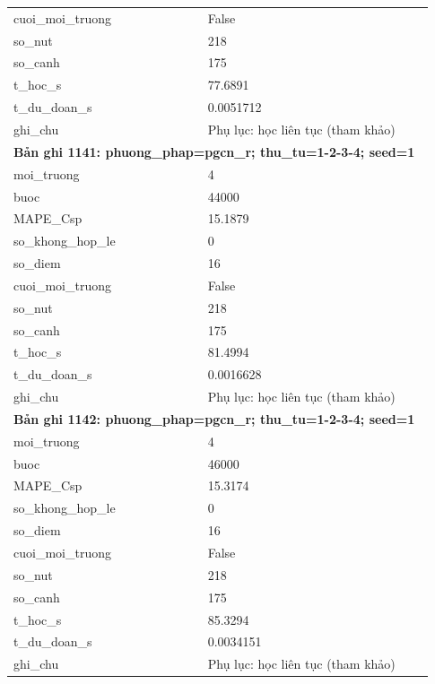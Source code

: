 \begin{longtable}{p{0.43\linewidth}p{0.50\linewidth}}
cuoi\_\allowbreak moi\_\allowbreak truong & False \\
so\_\allowbreak nut & 218 \\
so\_\allowbreak canh & 175 \\
t\_\allowbreak hoc\_\allowbreak s & 77.6891 \\
t\_\allowbreak du\_\allowbreak doan\_\allowbreak s & 0.0051712 \\
ghi\_\allowbreak chu & Phụ lục: học liên tục (tham khảo) \\
\midrule
\multicolumn{2}{p{0.95\linewidth}}{\textbf{Bản ghi 1141: phuong\_phap=pgcn\_r; thu\_tu=1-2-3-4; seed=1}} \\
moi\_\allowbreak truong & 4 \\
buoc & 44000 \\
MAPE\_\allowbreak Csp & 15.1879 \\
so\_\allowbreak khong\_\allowbreak hop\_\allowbreak le & 0 \\
so\_\allowbreak diem & 16 \\
cuoi\_\allowbreak moi\_\allowbreak truong & False \\
so\_\allowbreak nut & 218 \\
so\_\allowbreak canh & 175 \\
t\_\allowbreak hoc\_\allowbreak s & 81.4994 \\
t\_\allowbreak du\_\allowbreak doan\_\allowbreak s & 0.0016628 \\
ghi\_\allowbreak chu & Phụ lục: học liên tục (tham khảo) \\
\midrule
\multicolumn{2}{p{0.95\linewidth}}{\textbf{Bản ghi 1142: phuong\_phap=pgcn\_r; thu\_tu=1-2-3-4; seed=1}} \\
moi\_\allowbreak truong & 4 \\
buoc & 46000 \\
MAPE\_\allowbreak Csp & 15.3174 \\
so\_\allowbreak khong\_\allowbreak hop\_\allowbreak le & 0 \\
so\_\allowbreak diem & 16 \\
cuoi\_\allowbreak moi\_\allowbreak truong & False \\
so\_\allowbreak nut & 218 \\
so\_\allowbreak canh & 175 \\
t\_\allowbreak hoc\_\allowbreak s & 85.3294 \\
t\_\allowbreak du\_\allowbreak doan\_\allowbreak s & 0.0034151 \\
ghi\_\allowbreak chu & Phụ lục: học liên tục (tham khảo) \\

\end{longtable}
